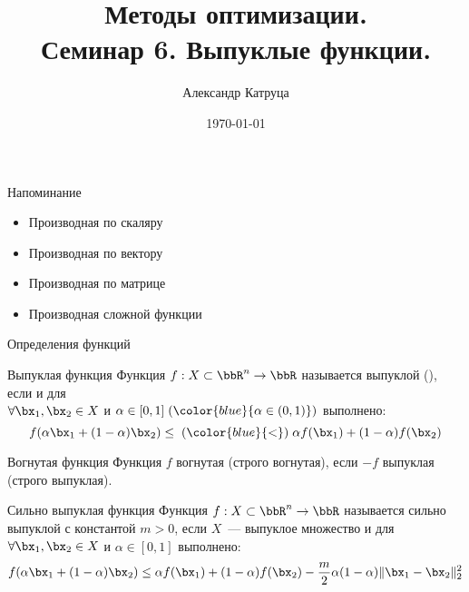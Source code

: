 \documentclass[12pt]{beamer}
\title[Семинар 6]{Методы оптимизации. \\
 Семинар 6. Выпуклые функции.}
\author{Александр Катруца}
\institute{Московский физико-технический институт,\\
Факультет Управления и Прикладной Математики}
\date{\today}
\begin{document}
\begin{frame}
\maketitle
\end{frame}

\begin{frame}{Напоминание}
\begin{itemize}
\item Производная по скаляру
\item Производная по вектору
\item Производная по матрице
\item Производная сложной функции
\end{itemize}
\end{frame}

\begin{frame}{Определения функций}
\small
\begin{block}{Выпуклая функция}
Функция $f: X \subset \bbR^n \rightarrow \bbR$ называется выпуклой ({\color{blue}{строго выпуклой}}), если {\color{red}{$X$~--- выпуклое множество}} и для \\ 
$\forall \bx_1, \bx_2 \in X$ и $\alpha \in [0, 1] \; ({\color{blue}{\alpha \in (0, 1)}})$  выполнено:
\vspace{-4mm}
\[
f(\alpha \bx_1 + (1 - \alpha)\bx_2) \leq \; ({\color{blue}{<}}) \; \alpha f(\bx_1) + (1 - \alpha)f(\bx_2)
\]
\end{block}

\begin{block}{Вогнутая функция}
Функция $f$ вогнутая (строго вогнутая), если $-f$ выпуклая (строго выпуклая).
\end{block}

\begin{block}{Сильно выпуклая функция}
Функция $f: X \subset \bbR^n \rightarrow \bbR$ называется сильно  выпуклой с константой $m > 0$, если $X$~--- выпуклое множество и для $\forall \bx_1, \bx_2 \in X$ и $\alpha \in [0, 1]$  выполнено:
\vspace{-4mm}
\[
f(\alpha \bx_1 + (1 - \alpha)\bx_2) \leq \alpha f(\bx_1) + (1 - \alpha)f(\bx_2) - \frac{m}{2} \alpha (1 - \alpha) \| \bx_1 - \bx_2 \|_2^2
\]
\end{block}

\end{frame}
\end{document}
